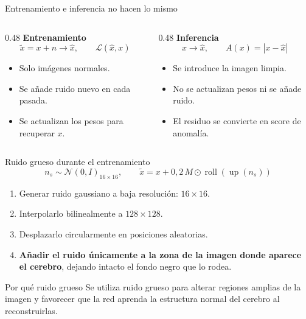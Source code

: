 \documentclass[10pt,aspectratio=169]{beamer}
\begin{document}
\begin{frame}{Entrenamiento e inferencia no hacen lo mismo}
  \begin{columns}[T]
    \begin{column}{0.48\textwidth}
      \textbf{Entrenamiento}
      \[
        \widetilde{x}=x+n\longrightarrow \hat{x},
        \qquad \mathcal L(\hat{x},x)
      \]
      \begin{itemize}
        \item Solo imágenes normales.
        \item Se añade ruido nuevo en cada pasada.
        \item Se actualizan los pesos para recuperar $x$.
      \end{itemize}
    \end{column}
    \begin{column}{0.48\textwidth}
      \textbf{Inferencia}
      \[
        x\longrightarrow\hat{x},
        \qquad A(x)=|x-\hat{x}|
      \]
      \begin{itemize}
        \item Se introduce la imagen limpia.
        \item No se actualizan pesos ni se añade ruido.
        \item El residuo se convierte en score de anomalía.
      \end{itemize}
    \end{column}
  \end{columns}
\end{frame}

\begin{frame}{Ruido grueso durante el entrenamiento}
  \[
  n_s\sim\mathcal N(0,I)_{16\times16},\qquad
  \widetilde{x}=x+0{,}2\,M\odot\operatorname{roll}(\operatorname{up}(n_s))
  \]

  \begin{enumerate}
    \item Generar ruido gaussiano a baja resolución: $16\times16$.
    \item Interpolarlo bilinealmente a $128\times128$.
    \item Desplazarlo circularmente en posiciones aleatorias.
    \item \textbf{Añadir el ruido únicamente a la zona de la imagen donde aparece el cerebro}, dejando intacto el fondo negro que lo rodea.
  \end{enumerate}

  \begin{block}{Por qué ruido grueso}
    Se utiliza ruido grueso para alterar regiones amplias de la imagen y favorecer
    que la red aprenda la estructura normal del cerebro al reconstruirlas.
  \end{block}
\end{frame}
\end{document}
